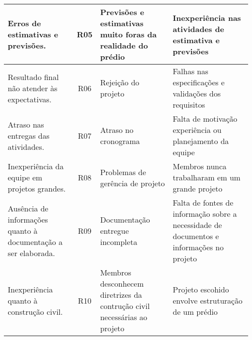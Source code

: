 \begin{table}[h]
\begin{tabular}{|l|c|l|l|}
    \parbox[t]{5cm}{Erros de estimativas e previsões.}                              & R05                    & \parbox[t]{4cm}{Previsões e estimativas muito foras da realidade do prédio}               & \parbox[t]{4cm}{Inexperiência nas atividades de estimativa e previsões}                                   \\ \hline
    \parbox[t]{5cm}{Resultado final não atender às expectativas.}                   & R06                    & \parbox[t]{4cm}{Rejeição do projeto}                                                      & \parbox[t]{4cm}{Falhas nas especificações e validações dos requisitos}                                    \\ \hline
    \parbox[t]{5cm}{Atraso nas entregas das atividades.}                            & R07                    & \parbox[t]{4cm}{Atraso no cronograma}                                                     & \parbox[t]{4cm}{Falta de motivação experiência ou planejamento da equipe}                                 \\ \hline
    \parbox[t]{5cm}{Inexperiência da equipe em projetos grandes.}                   & R08                    & \parbox[t]{4cm}{Problemas de gerência de projeto}                                         & \parbox[t]{4cm}{Membros nunca trabalharam em um grande projeto}                                           \\ \hline
    \parbox[t]{5cm}{Ausência de informações quanto à documentação a ser elaborada.} & R09                    & \parbox[t]{4cm}{Documentação entregue incompleta}                                         & \parbox[t]{4cm}{Falta de fontes de informação sobre a necessidade de documentos e informações no projeto} \\ \hline
    \parbox[t]{5cm}{Inexperiência quanto à construção civil.}                       & R10                    & \parbox[t]{4cm}{Membros desconhecem diretrizes da contrução civil necessárias ao projeto} & \parbox[t]{4cm}{Projeto escohido envolve estruturação de um prédio}                                       \\ \hline
  \end{tabular}
\end{table}

